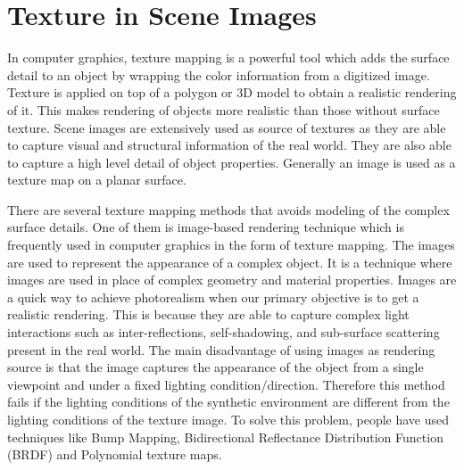 
\section{Texture in Scene Images}

In computer graphics, texture mapping is a powerful tool which adds the surface detail to an object by wrapping
the color information from a digitized image. 
Texture is applied on top of a
polygon or 3D model to obtain a realistic rendering of it.
This makes rendering of objects more realistic than those without
surface texture. 
Scene images are extensively
used as source of textures as they are able to capture visual and structural information of the real world. They
are also able to capture a high level detail of object properties.
Generally an image is used as a texture map
on a planar surface. 

There are several texture mapping methods that avoids
modeling of the complex surface details. 
One of them is image-based rendering technique which is frequently used in computer graphics
in the form of texture mapping. The images are used to represent the appearance of a complex object.
It is a technique where images are used in place of complex geometry and material 
properties. Images are a quick way to achieve photorealism when our primary objective is to get 
a realistic rendering. This is because they are able to capture 
complex light interactions such as inter-reflections,
self-shadowing, and sub-surface scattering present in the real world.
The main disadvantage of using images as rendering source is that the image captures the
appearance of the object from a single viewpoint and under a fixed lighting condition/direction. 
Therefore this method fails if the lighting conditions of the synthetic
environment are different from the lighting conditions of the texture image. 
To solve this
problem, 
people have used techniques like Bump Mapping, Bidirectional
Reflectance Distribution Function (BRDF) and Polynomial texture maps. 

